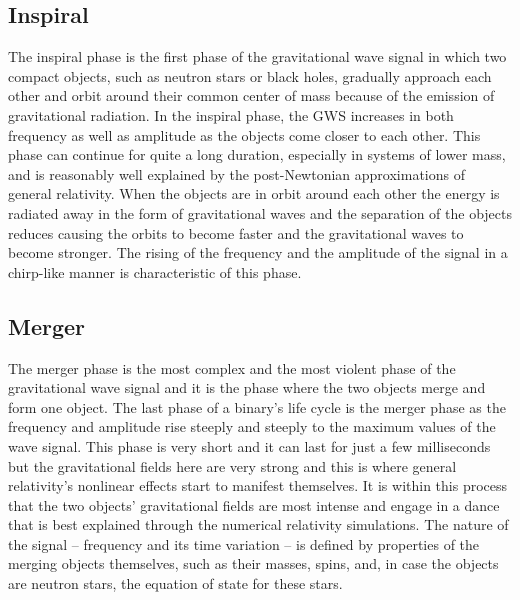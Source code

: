     \subsection{Inspiral}
    The inspiral phase is the first phase of the gravitational wave signal in which two compact objects, such as neutron stars or black holes, gradually approach each other and orbit around their common center of mass because of the emission of gravitational radiation. In the inspiral phase, the GWS increases in both frequency as well as amplitude as the objects come closer to each other. This phase can continue for quite a long duration, especially in systems of lower mass, and is reasonably well explained by the post-Newtonian approximations of general relativity. When the objects are in orbit around each other the energy is radiated away in the form of gravitational waves and the separation of the objects reduces causing the orbits to become faster and the gravitational waves to become stronger. The rising of the frequency and the amplitude of the signal in a chirp-like manner is characteristic of this phase.
    
    \subsection{Merger}
    The merger phase is the most complex and the most violent phase of the gravitational wave signal and it is the phase where the two objects merge and form one object. The last phase of a binary’s life cycle is the merger phase as the frequency and amplitude rise steeply and steeply to the maximum values of the wave signal. This phase is very short and it can last for just a few milliseconds but the gravitational fields here are very strong and this is where general relativity’s nonlinear effects start to manifest themselves. It is within this process that the two objects’ gravitational fields are most intense and engage in a dance that is best explained through the numerical relativity simulations. The nature of the signal – frequency and its time variation – is defined by properties of the merging objects themselves, such as their masses, spins, and, in case the objects are neutron stars, the equation of state for these stars.
    
